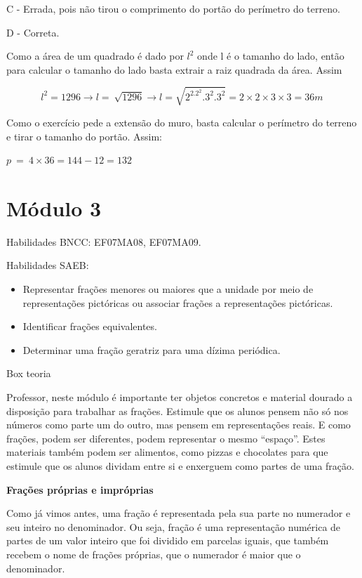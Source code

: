 C - Errada, pois não tirou o comprimento do portão do perímetro do
terreno.

D - Correta.

Como a área de um quadrado é dado por $l^2$ onde l é o tamanho do lado,
então para calcular o tamanho do lado basta extrair a raiz quadrada da
área. Assim

\[l^{2} = 1296 \rightarrow l = \ \sqrt{1296} \rightarrow l = \sqrt{2^2.2^{2}.3^{2}.3^{2}} = 2 \times 2 \times 3 \times 3 = 36m\ \]

Como o exercício pede a extensão do muro, basta calcular o perímetro do
terreno e tirar o tamanho do portão. Assim:

\(p\  = \ 4 \times 36 = 144 - 12 = 132\)

\section{Módulo 3}

Habilidades BNCC: EF07MA08, EF07MA09.

Habilidades SAEB:

\begin{itemize}
\item
  Representar frações menores ou maiores que a unidade por meio de
  representações pictóricas ou associar frações a representações
  pictóricas.
\item
  Identificar frações equivalentes.
\item
  Determinar uma fração geratriz para uma dízima periódica.
\end{itemize}

Box teoria

Professor, neste módulo é importante ter objetos concretos e material
dourado a disposição para trabalhar as frações. Estimule que os alunos
pensem não só nos números como parte um do outro, mas pensem em
representações reais. E como frações, podem ser diferentes, podem
representar o mesmo ``espaço''. Estes materiais também podem ser
alimentos, como pizzas e chocolates para que estimule que os alunos
dividam entre si e enxerguem como partes de uma fração.

\textbf{Frações próprias e impróprias}

Como já vimos antes, uma fração é representada pela sua parte no
numerador e seu inteiro no denominador. Ou seja, fração é uma
representação numérica de partes de um valor inteiro que foi dividido em
parcelas iguais, que também recebem o nome de frações próprias, que o
numerador é maior que o denominador.

